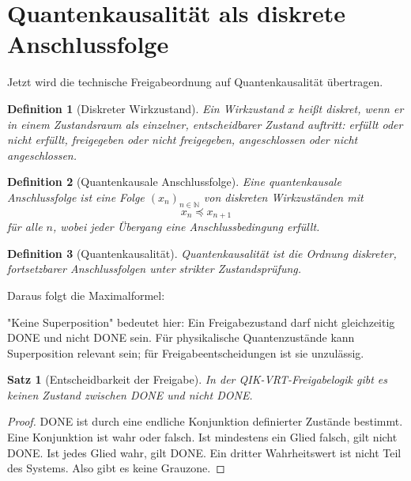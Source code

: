 \documentclass[11pt,a4paper,oneside]{scrartcl}
\theoremstyle{qikstyle}
\newtheorem{definition}{Definition}[section]
\newtheorem{satz}{Satz}[section]
\newcommand{\N}{\mathbb{N}}
\begin{document}
\section{Quantenkausalität als diskrete Anschlussfolge}

Jetzt wird die technische Freigabeordnung auf Quantenkausalität übertragen.

\begin{definition}[Diskreter Wirkzustand]
Ein Wirkzustand \(x\) heißt diskret, wenn er in einem Zustandsraum als einzelner, entscheidbarer Zustand auftritt: erfüllt oder nicht erfüllt, freigegeben oder nicht freigegeben, angeschlossen oder nicht angeschlossen.
\end{definition}

\begin{definition}[Quantenkausale Anschlussfolge]
Eine quantenkausale Anschlussfolge ist eine Folge \((x_n)_{n\in\N}\) von diskreten Wirkzuständen mit
\[
x_n \preceq x_{n+1}
\]
für alle \(n\), wobei jeder Übergang eine Anschlussbedingung erfüllt.
\end{definition}

\begin{definition}[Quantenkausalität]
Quantenkausalität ist die Ordnung diskreter, fortsetzbarer Anschlussfolgen unter strikter Zustandsprüfung.
\end{definition}

Daraus folgt die Maximalformel:
\begin{center}
\end{center}

"Keine Superposition" bedeutet hier: Ein Freigabezustand darf nicht gleichzeitig DONE und nicht DONE sein. Für physikalische Quantenzustände kann Superposition relevant sein; für Freigabeentscheidungen ist sie unzulässig.

\begin{satz}[Entscheidbarkeit der Freigabe]
In der QIK-VRT-Freigabelogik gibt es keinen Zustand zwischen DONE und nicht DONE.
\end{satz}

\begin{proof}
DONE ist durch eine endliche Konjunktion definierter Zustände bestimmt. Eine Konjunktion ist wahr oder falsch. Ist mindestens ein Glied falsch, gilt nicht DONE. Ist jedes Glied wahr, gilt DONE. Ein dritter Wahrheitswert ist nicht Teil des Systems. Also gibt es keine Grauzone.
\end{proof}
\newpage
\end{document}
